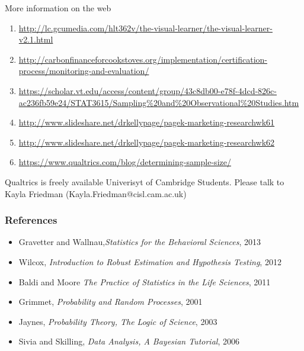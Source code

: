 \documentclass[10pt, compress]{beamer}
\begin{document}
\begin{frame}[t]{More information on the web}
    \begin{enumerate}
        \small
        \item \url{http://lc.gcumedia.com/hlt362v/the-visual-learner/the-visual-learner-v2.1.html}
        \item  \url{http://carbonfinanceforcookstoves.org/implementation/certification-process/monitoring-and-evaluation/}
        \item \url{https://scholar.vt.edu/access/content/group/43c8db00-e78f-4dcd-826c-ac236fb59e24/STAT3615/Sampling\%20and\%20Observational\%20Studies.htm}
        \item \url{http://www.slideshare.net/drkellypage/pagek-marketing-researchwk61}
        \item \url{http://www.slideshare.net/drkellypage/pagek-marketing-researchwk62}
        \item \url{https://www.qualtrics.com/blog/determining-sample-size/}
    \end{enumerate}
    \alert{Qualtrics is freely available Univerisyt of Cambridge Students. Please talk to
    Kayla Friedman (Kayla.Friedman@cisl.cam.ac.uk)}
\end{frame}

\begin{frame}
    \frametitle{References}
    \begin{itemize}
        \item \alert{Gravetter and Wallnau},\emph{Statistics for the Behavioral Sciences}, 2013
        \item \alert{Wilcox}, \emph{Introduction to Robust Estimation and Hypothesis Testing}, 2012
        \item \alert{Baldi and Moore} \emph{The Practice of Statistics in the Life Sciences}, 2011
        \item \alert{Grimmet}, \emph{Probability and Random Processes}, 2001
        \item \alert{Jaynes}, \emph{Probability Theory, The Logic of Science}, 2003
        \item \alert{Sivia and Skilling}, \emph{Data Analysis, A Bayesian Tutorial}, 2006
    \end{itemize}
\end{frame}
\end{document}
